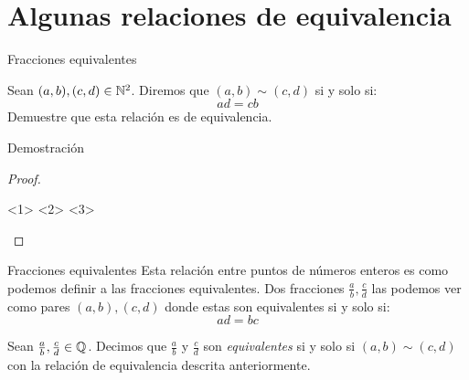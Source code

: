 \section{Algunas relaciones de equivalencia}
\begin{frame}{Fracciones equivalentes}
	\begin{exercise}
		Sean $ (a, b), (c, d)\in\nmath[2] $. Diremos que $ (a, b)\sim(c, d) $ si y solo si:
		\[ ad = cb \]
		Demuestre que esta relación es de equivalencia.
	\end{exercise}
\end{frame}
\begin{frame}{Demostración}
	\begin{proof}
		\begin{itemize}
			<1>
			<2>
		<3>
		\end{itemize}
	\end{proof}
\end{frame}
\begin{frame}{Fracciones equivalentes}
	Esta relación entre puntos de números enteros es como podemos definir a las fracciones equivalentes. Dos fracciones $ \frac{a}{b}, \frac{c}{d} $ las podemos ver como pares $ (a, b), (c, d) $ donde estas son equivalentes si y solo si:
	\[ ad = bc \]
	\begin{mdefinition}
		Sean $ \frac{a}{b}, \frac{c}{d}\in\qmath $. Decimos que $ \frac{a}{b} $ y $ \frac{c}{d} $ son \emph{equivalentes} si y solo si $ (a, b)\sim(c, d) $ con la relación de equivalencia descrita anteriormente.
	\end{mdefinition}
\end{frame}

